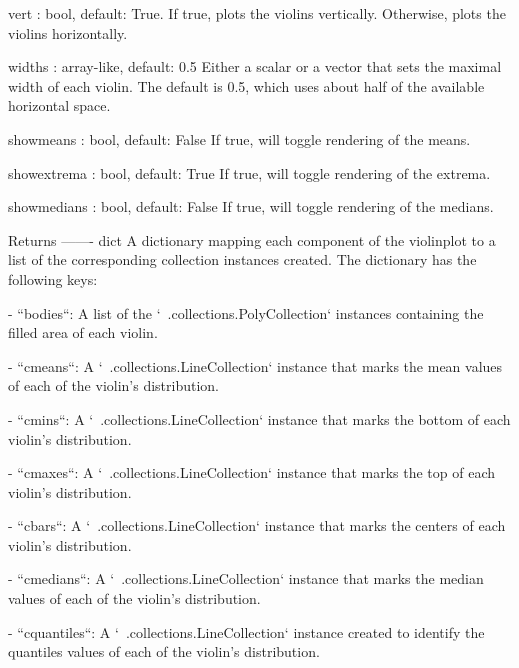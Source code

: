 \begin{DoxyVerb}
\begin{DoxyVerb}
vert : bool, default: True.
  If true, plots the violins vertically.
  Otherwise, plots the violins horizontally.

widths : array-like, default: 0.5
  Either a scalar or a vector that sets the maximal width of
  each violin. The default is 0.5, which uses about half of the
  available horizontal space.

showmeans : bool, default: False
  If true, will toggle rendering of the means.

showextrema : bool, default: True
  If true, will toggle rendering of the extrema.

showmedians : bool, default: False
  If true, will toggle rendering of the medians.

Returns
-------
dict
  A dictionary mapping each component of the violinplot to a
  list of the corresponding collection instances created. The
  dictionary has the following keys:

  - ``bodies``: A list of the `~.collections.PolyCollection`
    instances containing the filled area of each violin.

  - ``cmeans``: A `~.collections.LineCollection` instance that marks
    the mean values of each of the violin's distribution.

  - ``cmins``: A `~.collections.LineCollection` instance that marks
    the bottom of each violin's distribution.

  - ``cmaxes``: A `~.collections.LineCollection` instance that marks
    the top of each violin's distribution.

  - ``cbars``: A `~.collections.LineCollection` instance that marks
    the centers of each violin's distribution.

  - ``cmedians``: A `~.collections.LineCollection` instance that
    marks the median values of each of the violin's distribution.

  - ``cquantiles``: A `~.collections.LineCollection` instance created
    to identify the quantiles values of each of the violin's
    distribution.\end{DoxyVerb}
 \mbox{\label{classmatplotlib_1_1axes_1_1__axes_1_1Axes_a16b0b53944961117e4850bee3b049a53}} 

\end{DoxyVerb}
